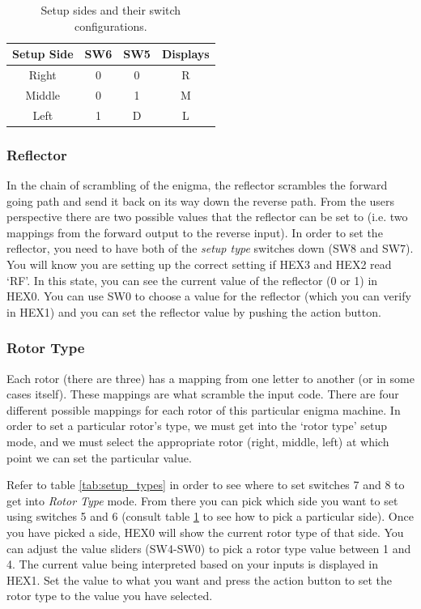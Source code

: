 \documentclass{article}
\begin{document}
\begin{table}[ht!]
    \centering
    \begin{tabular}{|c|c|c|c|}
        \hline
        Setup Side & SW6 & SW5 & Displays \\ 
        \hline \hline
        Right & 0 & 0 & R \\
        \hline
        Middle & 0 & 1 & M \\
        \hline
        Left & 1 & D & L \\
        \hline
    \end{tabular}
    \caption{Setup sides and their switch configurations.}
    \label{tab:setup_sides}
\end{table}

\subsubsection{Reflector}
In the chain of scrambling of the enigma, the reflector scrambles the forward going path and send it back on its way down the reverse path. From the users perspective there are two possible values that the reflector can be set to (i.e. two mappings from the forward output to the reverse input). In order to set the reflector, you need to have both of the \textit{setup type} switches down (SW8 and SW7). You will know you are setting up the correct setting if HEX3 and HEX2 read `RF'. In this state, you can see the current value of the reflector (0 or 1) in HEX0. You can use SW0 to choose a value for the reflector (which you can verify in HEX1) and you can set the reflector value by pushing the action button. 

\subsubsection{Rotor Type}
Each rotor (there are three) has a mapping from one letter to another (or in some cases itself). These mappings are what scramble the input code. There are four different possible mappings for each rotor of this particular enigma machine. In order to set a particular rotor's type, we must get into the `rotor type' setup mode, and we must select the appropriate rotor (right, middle, left) at which point we can set the particular value. 

Refer to table \ref{tab:setup_types} in order to see where to set switches 7 and 8 to get into \textit{Rotor Type} mode. From there you can pick which side you want to set using switches 5 and 6 (consult table \ref{tab:setup_sides} to see how to pick a particular side). Once you have picked a side, HEX0 will show the current rotor type of that side. You can adjust the value sliders (SW4-SW0) to pick a rotor type value between 1 and 4. The current value being interpreted based on your inputs is displayed in HEX1. Set the value to what you want and press the action button to set the rotor type to the value you have selected. 
\end{document}
